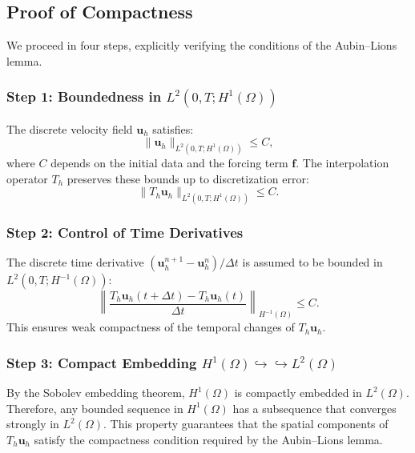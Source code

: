 \documentclass[12pt]{article}
\begin{document}
\subsection{Proof of Compactness}

We proceed in four steps, explicitly verifying the conditions of the Aubin--Lions lemma.

\subsubsection{Step 1: Boundedness in $L^2(0,T; H^1(\Omega))$}

The discrete velocity field $\mathbf{u}_h$ satisfies:
\begin{equation}
\|\mathbf{u}_h\|_{L^2(0,T; H^1(\Omega))} \leq C,
\end{equation}
where $C$ depends on the initial data and the forcing term $\mathbf{f}$. The interpolation operator $T_h$ preserves these bounds up to discretization error:
\begin{equation}
\|T_h \mathbf{u}_h\|_{L^2(0,T; H^1(\Omega))} \leq C.
\end{equation}

\subsubsection{Step 2: Control of Time Derivatives}

The discrete time derivative \((\mathbf{u}_h^{n+1} - \mathbf{u}_h^n)/\Delta t\) is assumed to be bounded in $L^2(0,T; H^{-1}(\Omega))$:
\begin{equation}
\left\|\frac{T_h \mathbf{u}_h(t+\Delta t) - T_h \mathbf{u}_h(t)}{\Delta t}\right\|_{H^{-1}(\Omega)} \leq C.
\end{equation}
This ensures weak compactness of the temporal changes of $T_h \mathbf{u}_h$.

\subsubsection{Step 3: Compact Embedding $H^1(\Omega) \hookrightarrow\hookrightarrow L^2(\Omega)$}

By the Sobolev embedding theorem, $H^1(\Omega)$ is compactly embedded in $L^2(\Omega)$. Therefore, any bounded sequence in $H^1(\Omega)$ has a subsequence that converges strongly in $L^2(\Omega)$. This property guarantees that the spatial components of $T_h \mathbf{u}_h$ satisfy the compactness condition required by the Aubin--Lions lemma.
\end{document}

